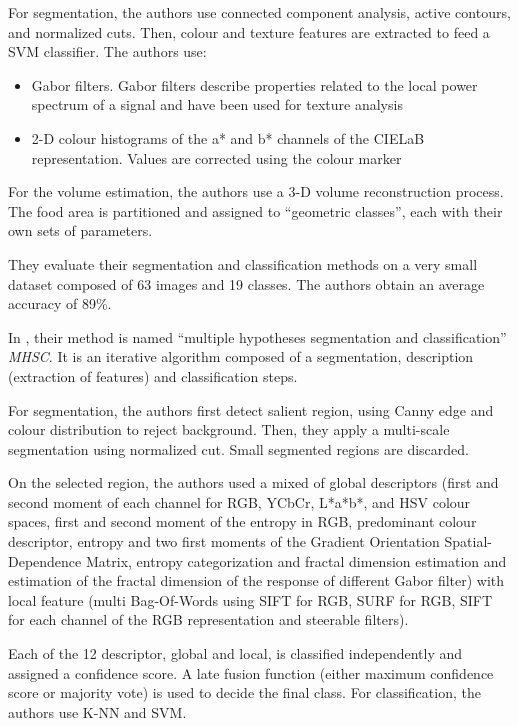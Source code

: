 For segmentation, the authors use connected component analysis, active contours, and normalized cuts. Then, colour and texture features are extracted to feed a SVM classifier. The authors use:
\begin{itemize}
    \item Gabor filters. Gabor filters describe properties related to the local power spectrum of a signal and have been used for texture analysis
    \item 2-D colour histograms of the a* and b* channels of the CIELaB representation. Values are corrected using the colour marker
\end{itemize}
For the volume estimation, the authors use a 3-D volume reconstruction process. The food area is partitioned and assigned to \enquote{geometric classes}, each with their own sets of parameters.

They evaluate their segmentation and classification methods on a very small dataset composed of 63 images and 19 classes. The authors obtain an average accuracy of 89\%.

In \cite{Zhu2015}, their method is named \enquote{multiple hypotheses segmentation and classification} \textit{MHSC}. It is an iterative algorithm composed of a segmentation, description (extraction of features) and classification steps.

For segmentation, the authors first detect salient region, using Canny edge and colour distribution to reject background. Then, they apply a multi-scale segmentation using normalized cut. Small segmented regions are discarded.

On the selected region, the authors used a mixed of global descriptors (first and second moment of each channel for RGB, YCbCr, L*a*b*, and HSV colour spaces, first and second moment of the entropy in RGB, predominant colour descriptor, entropy and two first moments of the Gradient Orientation Spatial-Dependence Matrix, entropy categorization and fractal dimension estimation and estimation of the fractal dimension of the response of different Gabor filter) with local feature (multi Bag-Of-Words using SIFT for RGB, SURF for RGB, SIFT for each channel of the RGB representation and steerable filters).

Each of the 12 descriptor, global and local, is classified independently and assigned a confidence score. A late fusion function (either maximum confidence score or majority vote) is used  to decide the final class. For classification, the authors use K-NN and SVM.

